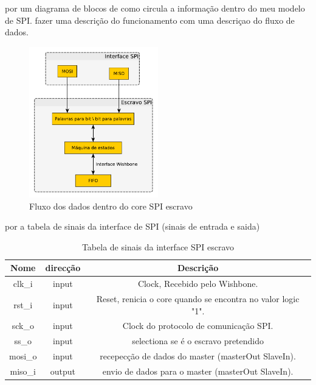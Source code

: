 por um diagrama de blocos de como circula a informa\c{c}\~ao dentro do meu modelo de SPI. fazer uma descri\c{c}\~ao do funcionamento com uma descri\c{c}ao do fluxo de dados.
\begin{figure}[!htb]
  \centering
  \includegraphics[width=0.50\textwidth]{grafos/diagrama_SPI_slave.pdf}
  \caption[Fluxo de dados dentro do core SPI escravo]{Fluxo dos dados dentro do core SPI escravo}
  \label{fig:diagrama_SPI_slave}
\end{figure}

por a tabela de sinais da interface de SPI (sinais de entrada e saida)
\begin{table}[h!]
  \begin{center}
    \begin{tabular}{|c|c|c|}
      \hline
      Nome & direcção & Descrição \\
      \hline \hline
      clk\_i & input & Clock, Recebido pelo Wishbone. \\
      \hline
      rst\_i & input & Reset, renicia o core quando se encontra no valor logic "1".\\
      \hline
      sck\_o & input & Clock do protocolo de comunicação SPI.\\
      \hline
      ss\_o & input & selectiona se é o escravo pretendido\\
      \hline
      mosi\_o & input & recepecção de dados do master (masterOut SlaveIn).\\
      \hline
      miso\_i & output & envio de dados para o master (masterOut SlaveIn).\\
      \hline
    \end{tabular}
  \end{center}
  \caption[Tabela de sinais SPI escravo]{Tabela de sinais da interface SPI escravo}
  \label{table:sinais_SPI_slave}
\end{table}

